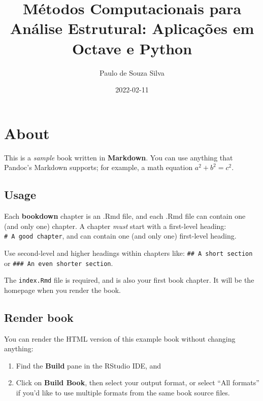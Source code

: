 \documentclass[
]{book}
\title{Métodos Computacionais para Análise Estrutural: Aplicações em Octave e Python}
\author{Paulo de Souza Silva}
\date{2022-02-11}
\begin{document}
\maketitle

{
\setcounter{tocdepth}{1}
\tableofcontents
}
\hypertarget{about}{%
\chapter*{About}\label{about}}

This is a \emph{sample} book written in \textbf{Markdown}. You can use anything that Pandoc's Markdown supports; for example, a math equation \(a^2 + b^2 = c^2\).

\hypertarget{usage}{%
\section*{Usage}\label{usage}}

Each \textbf{bookdown} chapter is an .Rmd file, and each .Rmd file can contain one (and only one) chapter. A chapter \emph{must} start with a first-level heading: \texttt{\#\ A\ good\ chapter}, and can contain one (and only one) first-level heading.

Use second-level and higher headings within chapters like: \texttt{\#\#\ A\ short\ section} or \texttt{\#\#\#\ An\ even\ shorter\ section}.

The \texttt{index.Rmd} file is required, and is also your first book chapter. It will be the homepage when you render the book.

\hypertarget{render-book}{%
\section*{Render book}\label{render-book}}

You can render the HTML version of this example book without changing anything:

\begin{enumerate}
\def\labelenumi{\arabic{enumi}.}
\item
  Find the \textbf{Build} pane in the RStudio IDE, and
\item
  Click on \textbf{Build Book}, then select your output format, or select ``All formats'' if you'd like to use multiple formats from the same book source files.
\end{enumerate}
\end{document}
